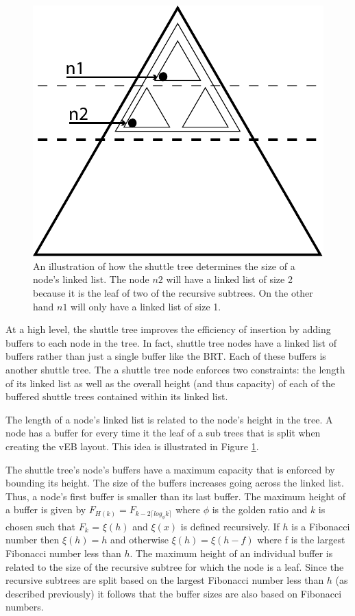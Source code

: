 \documentclass{style}
\begin{document}
\begin{figure}

\begin{center}
	\includegraphics[width=0.8\columnwidth]{figures/buffers.pdf}
\end{center}

\caption{An illustration of how the shuttle tree determines the size of a node's linked list. The 
node $n2$ will have a linked list of size 2 because it is the leaf of two of the recursive subtrees. 
On the other hand $n1$ will only have a linked list of size 1.}
\label{fig:buffers}
\end{figure}


At a high level, the shuttle tree improves the efficiency of insertion by
adding buffers to each node in the tree. In fact, shuttle tree nodes have a
linked list of buffers rather than just a single buffer like the BRT. Each of
these buffers is another shuttle tree. The a shuttle tree node enforces two
constraints: the length of its linked list as well as the overall height (and
thus capacity) of each of the buffered shuttle trees contained within its
linked list.

The length of a node's linked list is related to the node's height in the
tree. A node has a buffer for every time it the leaf of a sub trees that is
split when creating the vEB layout. This idea is illustrated in Figure
\ref{fig:buffers}.

The shuttle tree's node's buffers have a maximum capacity that is enforced by
bounding its height. The size of the buffers increases going across the linked
list. Thus, a node's first buffer is smaller than its last buffer. The maximum
height of a buffer is given by $F_{H(k)} = F_{k-2 \lceil log_{\phi} k \rceil}
$ where $\phi$ is the golden ratio and $k$ is chosen such that $F_k$ =
$\xi(h)$ and $\xi(x)$ is defined recursively. If $h$ is a Fibonacci number
then $\xi(h) = h$ and otherwise $\xi(h) = \xi(h-f)$ where f is the largest
Fibonacci number less than $h$. The maximum height of an individual buffer is
related to the size of the recursive subtree for which the node is a leaf.
Since the recursive subtrees are split based on the largest Fibonacci number
less than $h$ (as described previously) it follows that the buffer sizes are
also based on Fibonacci numbers.
\end{document}
